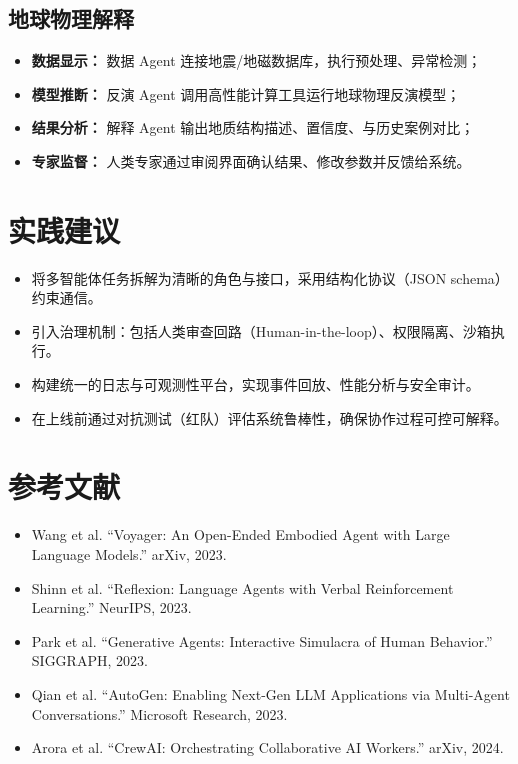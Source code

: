 \documentclass[UTF8,zihao=-4]{ctexart}
\begin{document}
\subsection{地球物理解释}
\begin{itemize}
  \item \textbf{数据显示：} 数据 Agent 连接地震/地磁数据库，执行预处理、异常检测；
  \item \textbf{模型推断：} 反演 Agent 调用高性能计算工具运行地球物理反演模型；
  \item \textbf{结果分析：} 解释 Agent 输出地质结构描述、置信度、与历史案例对比；
  \item \textbf{专家监督：} 人类专家通过审阅界面确认结果、修改参数并反馈给系统。
\end{itemize}

\section*{实践建议}
\begin{itemize}
  \item 将多智能体任务拆解为清晰的角色与接口，采用结构化协议（JSON schema）约束通信。
  \item 引入治理机制：包括人类审查回路（Human-in-the-loop）、权限隔离、沙箱执行。
  \item 构建统一的日志与可观测性平台，实现事件回放、性能分析与安全审计。
  \item 在上线前通过对抗测试（红队）评估系统鲁棒性，确保协作过程可控可解释。
\end{itemize}

\section*{参考文献}
\begin{itemize}
  \item Wang et al. ``Voyager: An Open-Ended Embodied Agent with Large Language Models.'' arXiv, 2023.
  \item Shinn et al. ``Reflexion: Language Agents with Verbal Reinforcement Learning.'' NeurIPS, 2023.
  \item Park et al. ``Generative Agents: Interactive Simulacra of Human Behavior.'' SIGGRAPH, 2023.
  \item Qian et al. ``AutoGen: Enabling Next-Gen LLM Applications via Multi-Agent Conversations.'' Microsoft Research, 2023.
  \item Arora et al. ``CrewAI: Orchestrating Collaborative AI Workers.'' arXiv, 2024.
\end{itemize}
\end{document}
